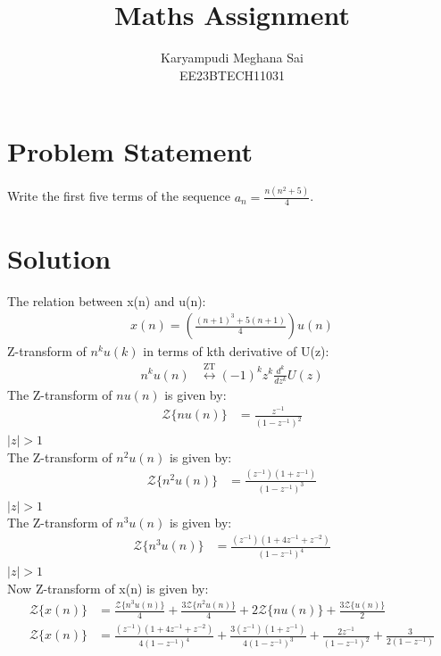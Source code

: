 \documentclass{article}
\begin{document}
\title{Maths Assignment}
\author{Karyampudi Meghana Sai\\ EE23BTECH11031}
\maketitle

\section*{Problem Statement}
Write the first five terms of the sequence \(a_n = \frac{n(n^2+5)}{4}\).

\section*{Solution}


The relation between x(n) and u(n):
\begin{align}
 x(n) = \left(\frac{(n+1)^3+5(n+1)}{4}\right) u(n)
 \end{align}
Z-transform of $n^ku(k)$ in terms of kth derivative of U(z):
\begin{align}
n^k u(n) &\overset{\text{ZT}}{\longleftrightarrow} (-1)^k z^k \frac{d^k}{dz^k}U(z)
\end{align}
The Z-transform of $nu(n)$ is given by:
\begin{align}
\mathcal{Z}\{nu(n)\} &= \frac{z^{-1}}{(1 - z^{-1})^2}
\end{align}
 $\lvert z \rvert > 1$\\
The Z-transform of $n^2u(n)$ is given by:
\begin{align}
\mathcal{Z}\{n^2u(n)\} &= \frac{(z^{-1})(1+z^{-1})}{(1-z^{-1})^3}
\end{align}
 $\lvert z \rvert > 1$\\
The Z-transform of $n^3u(n)$ is given by:
\begin{align}
\mathcal{Z}\{n^3u(n)\} &= \frac{(z^{-1})(1+4z^{-1}+z^{-2})}{(1-z^{-1})^4}
\end{align}
 $\lvert z \rvert > 1$\\
Now Z-transform of x(n) is given by:
\begin{align}
\mathcal{Z}\{x(n)\} &=\frac{\mathcal{Z}\{n^3u(n)\}}{4} +\frac{3\mathcal{Z}\{n^2u(n)\}}{4} +2\mathcal{Z}\{nu(n)\} +\frac{3\mathcal{Z}\{u(n)\}}{2}\\
\mathcal{Z}\{x(n)\} &=\frac{(z^{-1})(1+4z^{-1}+z^{-2})}{4(1-z^{-1})^4} +\frac{3(z^{-1})(1+z^{-1})}{4(1-z^{-1})^3} +\frac{2z^{-1}}{(1 - z^{-1})^2} +\frac{3}{2(1- z^{-1})}
\end{align}
\end{document}
